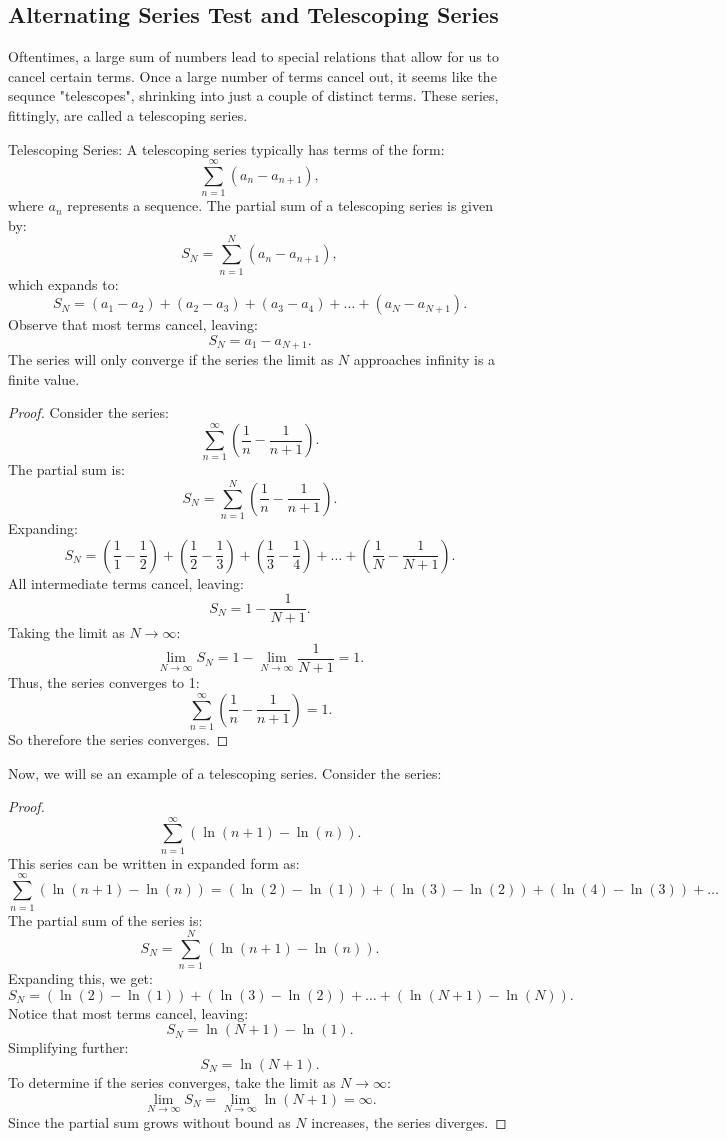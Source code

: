 \documentclass[a4paper, 11pt]{article}
\newenvironment{concept}{%
    \vspace{1em}
    \begin{tcolorbox}[colframe=black!70, colback=white!95, title=Definition]
}{%
    \end{tcolorbox}
    \vspace{1em}
}
\begin{document}
\subsection{Alternating Series Test and Telescoping Series}
Oftentimes, a large sum of numbers lead to special relations that allow for us to cancel certain terms. Once a large number of terms cancel out, it seems like the sequnce "telescopes", shrinking into just a couple of distinct terms. These series, fittingly, are called a telescoping series. 
\begin{concept}{Telescoping Series:}
    A telescoping series typically has terms of the form:
\[\sum_{n=1}^\infty (a_n - a_{n+1}),\]
where \(a_n\) represents a sequence.
The partial sum of a telescoping series is given by:
\[S_N = \sum_{n=1}^N (a_n - a_{n+1}),\]
which expands to:
\[S_N = (a_1 - a_2) + (a_2 - a_3) + (a_3 - a_4) + \dots + (a_N - a_{N+1}).\]
Observe that most terms cancel, leaving:
\[S_N = a_1 - a_{N+1}.\]
The series will only converge if the series the limit as $N$ approaches infinity is a finite value.
\end{concept}
\begin{proof}
Consider the series:
\[\sum_{n=1}^\infty \left(\frac{1}{n} - \frac{1}{n+1}\right).\]
The partial sum is:
\[S_N = \sum_{n=1}^N \left(\frac{1}{n} - \frac{1}{n+1}\right).\]
Expanding:
\[S_N = \left(\frac{1}{1} - \frac{1}{2}\right) + \left(\frac{1}{2} - \frac{1}{3}\right) + \left(\frac{1}{3} - \frac{1}{4}\right) + \dots + \left(\frac{1}{N} - \frac{1}{N+1}\right).\]
All intermediate terms cancel, leaving:
\[S_N = 1 - \frac{1}{N+1}.\]
Taking the limit as \(N \to \infty\):
\[\lim_{N \to \infty} S_N = 1 - \lim_{N \to \infty} \frac{1}{N+1} = 1.\]
Thus, the series converges to 1:
\[\sum_{n=1}^\infty \left(\frac{1}{n} - \frac{1}{n+1}\right) = 1.\]
So therefore the series converges.
\end{proof}
Now, we will se an example of a telescoping series. Consider the series:
\begin{proof}
\[\sum_{n=1}^\infty \left(\ln(n+1) - \ln(n)\right).\]
This series can be written in expanded form as:
\[\sum_{n=1}^\infty \left(\ln(n+1) - \ln(n)\right) = (\ln(2) - \ln(1)) + (\ln(3) - \ln(2)) + (\ln(4) - \ln(3)) + \dots\]
The partial sum of the series is:
\[S_N = \sum_{n=1}^N \left(\ln(n+1) - \ln(n)\right).\]
Expanding this, we get:
\[S_N = (\ln(2) - \ln(1)) + (\ln(3) - \ln(2)) + \dots + (\ln(N+1) - \ln(N)).\]
Notice that most terms cancel, leaving:
\[S_N = \ln(N+1) - \ln(1).\]
Simplifying further:
\[S_N = \ln(N+1).\]
To determine if the series converges, take the limit as \(N \to \infty\):
\[\lim_{N \to \infty} S_N = \lim_{N \to \infty} \ln(N+1) = \infty.\]
Since the partial sum grows without bound as \(N\) increases, the series diverges. 
\end{proof}
\end{document}
